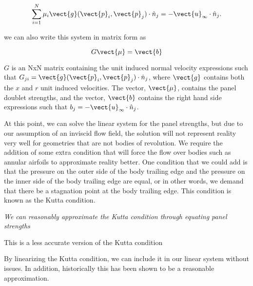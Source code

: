 \begin{equation}
    \sum_{i=1}^N \mu_i \vect{g}(\vect{p}_i,\vect{p}_j) \cdot \hat{n}_j = - \vect{u}_\infty \cdot \hat{n}_j.
\end{equation}

\noindent we can also write this system in matrix form as

\begin{equation}
    G \vect{\mu} = \vect{b}
\end{equation}

\where \(G\) is an NxN matrix containing the unit induced normal velocity expressions such that \(G_{ji} = \vect{g}(\vect{p}_i, \vect{p}_j) \cdot \hat{n}_j \), where \(\vect{g}\) contains both the \(x\) and \(r\) unit induced velocities.
The vector, \(\vect{\mu}\), contains the panel doublet strengths, and the vector,
\(\vect{b}\) contains the right hand side expressions such that
\(b_j = -\vect{u}_\infty \cdot \hat{n}_j \).

At this point, we can solve the linear system for the panel strengths,
but due to our assumption of an inviscid flow field, the solution will not represent reality very well for geometries that are not bodies of revolution.
We require the addition of some extra condition that will force the flow over bodies such as annular airfoils to approximate reality better.
One condition that we could add is that the pressure on the outer side of the body trailing edge and the pressure on the inner side of the body trailing edge are equal,
or in other words, we demand that there be a stagnation point at the body trailing edge.
This condition is known as the Kutta condition.

\begin{assumption}

    \textit{We can reasonably approximate the Kutta condition through equating panel strengths}

\smallskip

    \limit This is a less accurate version of the Kutta condition

\smallskip

    \why By linearizing the Kutta condition, we can include it in our linear system without issues.
    In addition, historically this has been shown to be a reasonable approximation.

\end{assumption}

